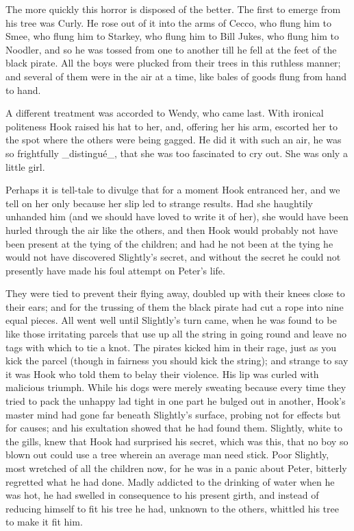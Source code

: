 The more quickly this horror is disposed of the better. The first to
emerge from his tree was Curly. He rose out of it into the arms of
Cecco, who flung him to Smee, who flung him to Starkey, who flung him
to Bill Jukes, who flung him to Noodler, and so he was tossed from one
to another till he fell at the feet of the black pirate. All the boys
were plucked from their trees in this ruthless manner; and several of
them were in the air at a time, like bales of goods flung from hand to
hand.

A different treatment was accorded to Wendy, who came last. With
ironical politeness Hook raised his hat to her, and, offering her his
arm, escorted her to the spot where the others were being gagged. He
did it with such an air, he was so frightfully _distingué_, that she
was too fascinated to cry out. She was only a little girl.

Perhaps it is tell-tale to divulge that for a moment Hook entranced
her, and we tell on her only because her slip led to strange results.
Had she haughtily unhanded him (and we should have loved to write it of
her), she would have been hurled through the air like the others, and
then Hook would probably not have been present at the tying of the
children; and had he not been at the tying he would not have discovered
Slightly's secret, and without the secret he could not presently have
made his foul attempt on Peter's life.

They were tied to prevent their flying away, doubled up with their
knees close to their ears; and for the trussing of them the black
pirate had cut a rope into nine equal pieces. All went well until
Slightly's turn came, when he was found to be like those irritating
parcels that use up all the string in going round and leave no tags
with which to tie a knot. The pirates kicked him in their rage, just as
you kick the parcel (though in fairness you should kick the string);
and strange to say it was Hook who told them to belay their violence.
His lip was curled with malicious triumph. While his dogs were merely
sweating because every time they tried to pack the unhappy lad tight in
one part he bulged out in another, Hook's master mind had gone far
beneath Slightly's surface, probing not for effects but for causes; and
his exultation showed that he had found them. Slightly, white to the
gills, knew that Hook had surprised his secret, which was this, that no
boy so blown out could use a tree wherein an average man need stick.
Poor Slightly, most wretched of all the children now, for he was in a
panic about Peter, bitterly regretted what he had done. Madly addicted
to the drinking of water when he was hot, he had swelled in consequence
to his present girth, and instead of reducing himself to fit his tree
he had, unknown to the others, whittled his tree to make it fit him.

